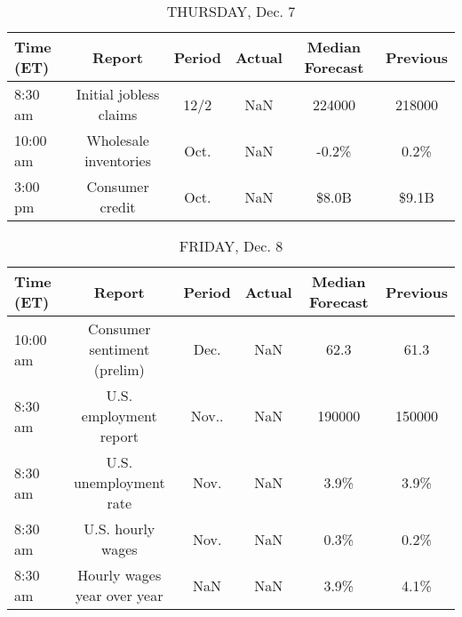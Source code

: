 \documentclass{article}%
\begin{document}
%


\begin{table}[htbp]%
\caption{THURSDAY, Dec. 7}%
\centering%
\begin{adjustbox}{width=1\textwidth}%
\begin{tabular}{lccccc}
\toprule
Time (ET) &                 Report & Period & Actual & Median Forecast & Previous \\
\midrule
  8:30 am & Initial jobless claims &   12/2 &    NaN &          224000 &   218000 \\
 10:00 am &  Wholesale inventories &   Oct. &    NaN &           -0.2\% &     0.2\% \\
  3:00 pm &        Consumer credit &   Oct. &    NaN &           \$8.0B &    \$9.1B \\
\bottomrule
\end{tabular}
%
\end{adjustbox}%
\end{table}

%


\begin{table}[htbp]%
\caption{FRIDAY, Dec. 8}%
\centering%
\begin{adjustbox}{width=1\textwidth}%
\begin{tabular}{lccccc}
\toprule
Time (ET) &                      Report & Period & Actual & Median Forecast & Previous \\
\midrule
 10:00 am & Consumer sentiment (prelim) &   Dec. &    NaN &            62.3 &     61.3 \\
  8:30 am &      U.S. employment report &  Nov.. &    NaN &          190000 &   150000 \\
  8:30 am &      U.S. unemployment rate &   Nov. &    NaN &            3.9\% &     3.9\% \\
  8:30 am &           U.S. hourly wages &   Nov. &    NaN &            0.3\% &     0.2\% \\
  8:30 am & Hourly wages year over year &    NaN &    NaN &            3.9\% &     4.1\% \\
\bottomrule
\end{tabular}
%
\end{adjustbox}%
\end{table}
\end{document}
